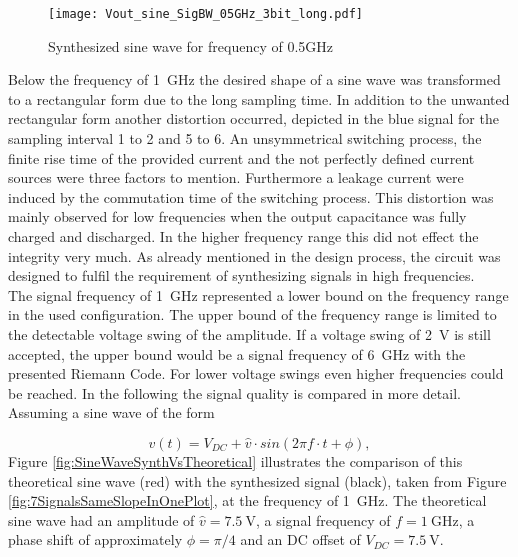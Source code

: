 \begin{figure}[htb!] %
   \centering
   \texttt{[image: Vout\_sine\_SigBW\_05GHz\_3bit\_long.pdf]}
   \caption{Synthesized sine wave for frequency of 0.5GHz}
   \label{fig:SineWave05GHz}
\end{figure}


Below the frequency of \SI{1}{\GHz} the desired shape of a sine wave was transformed to a rectangular  form due to the long sampling time.
In addition to the unwanted rectangular form another distortion occurred, depicted in the blue signal for the sampling interval 1 to 2 and 5 to 6.
An unsymmetrical switching process, the finite rise time of the provided current and the not perfectly defined current sources were three factors to mention. %
Furthermore a leakage current were induced by the commutation time of the switching process.
This distortion was mainly observed for low frequencies when the output capacitance was fully charged and discharged.
In the higher frequency range this did not effect the integrity very much.
As already mentioned in the design process, the circuit was designed to fulfil the requirement of synthesizing signals in high frequencies.\\
The signal frequency of \SI{1}{\giga \hertz} represented a lower bound on the frequency range in the used configuration. %
The upper bound of the frequency range is limited to the detectable voltage swing of the amplitude.
If a voltage swing of \SI{2}{\volt} is still accepted, the upper bound would be a signal frequency of \SI{6}{\GHz} with the presented Riemann Code.
For lower voltage swings even higher frequencies could be reached.
In the following the signal quality is compared in more detail.
Assuming a sine wave of the form

\begin{equation}
	v(t)= V_{DC} + \widehat{v} \cdot sin( 2  \pi  f \cdot  t + \phi),
\end{equation}
Figure \ref{fig:SineWaveSynthVsTheoretical} illustrates the comparison of this theoretical sine wave (red) with the synthesized signal (black), taken from Figure \ref{fig:7SignalsSameSlopeInOnePlot}, at the frequency of \SI{1}{\GHz}.
The theoretical sine wave had an amplitude of $\widehat{v} = \SI{7.5}{\volt}$, a signal frequency of $f = \SI{1}{\giga \hertz}$, a phase shift of approximately $\phi = \pi / 4$ and an DC offset of $V_{DC} = \SI{7.5}{\volt}$.


